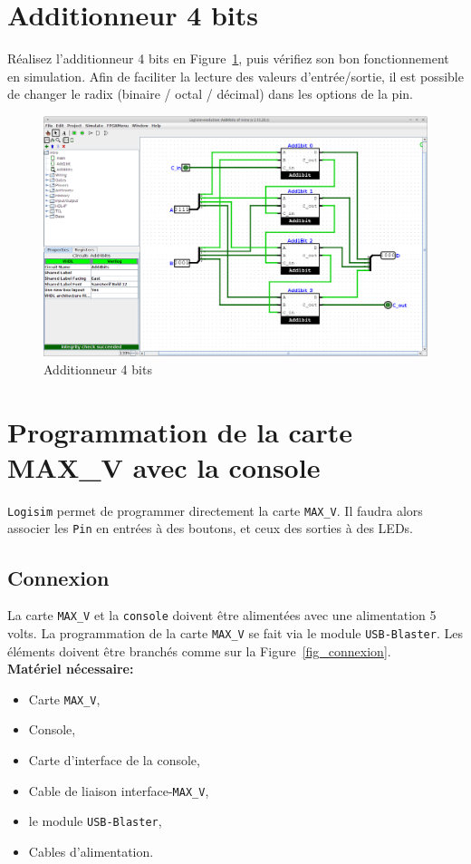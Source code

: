 \documentclass[nosolution]{exercice}
\begin{document}
\section{Additionneur 4 bits}

Réalisez l'additionneur 4 bits en Figure~\ref{fig_add4bits}, puis vérifiez son bon fonctionnement en simulation.
Afin de faciliter la lecture des valeurs d'entrée/sortie, il est possible de changer le radix (binaire / octal / décimal) dans les options de la pin.
\begin{figure}[H]
\begin{center}
\includegraphics[width=385pt]{images/logisim_add4bits.png}
\caption{\label{fig_add4bits}Additionneur 4 bits}
\end{center}
\end{figure}


\newpage
\section{Programmation de la carte MAX\_V avec la console}

\texttt{Logisim} permet de programmer directement la carte \texttt{MAX\_V}. Il faudra alors associer les
\texttt{Pin} en entrées à des boutons, et ceux des sorties à des LEDs.


\subsection{Connexion}
La carte \texttt{MAX\_V} et la \texttt{console} doivent être alimentées avec une alimentation 5 volts.
La programmation de la carte \texttt{MAX\_V} se fait via le module \texttt{USB-Blaster}.
Les éléments doivent être branchés comme sur la Figure~\ref{fig_connexion}.\\
\textbf{Matériel nécessaire:}
\begin{itemize}
\item Carte \texttt{MAX\_V},
\item Console,
\item Carte d'interface de la console,
\item Cable de liaison interface-\texttt{MAX\_V},
\item le module \texttt{USB-Blaster},
\item Cables d'alimentation.
\end{itemize}
\end{document}
